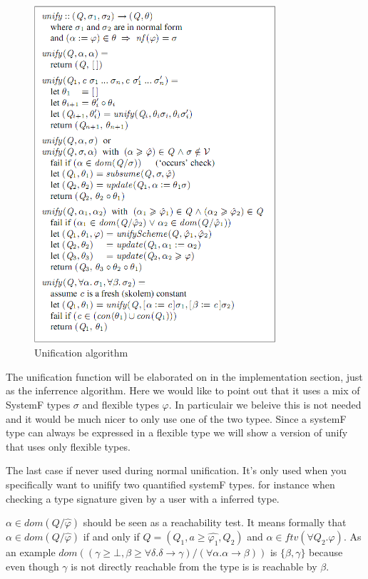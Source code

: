 \documentclass[12pt, a4paper, oneside]{article}
\begin{document}
\begin{figure}[h!]
  \centering
    \includegraphics[width=0.8\textwidth]{unify}
  \caption{Unification algorithm}
\end{figure}

The unification function will be elaborated on in the implementation section, just as the inferrence algorithm. Here we would like to point out that it uses a mix of SystemF types $\sigma$ and flexible types $\varphi$. In particulair we beleive this is not needed and it would be much nicer to only use one of the two typee. Since a systemF type can always be expressed in a flexible type we will show a version of unify that uses only flexible types.

The last case if never used during normal unification. It's only used when you specifically want to unifify two quantified systemF types. for instance when checking a type signature given by a user with a inferred type.

$\alpha \in dom(Q/\hat{\varphi})$ should be seen as a reachability test. It means formally that $\alpha \in dom(Q/\hat{\varphi})$ if and only if $Q = (Q_1, a \geq \hat{\varphi_1}, Q_2)$ and $\alpha \in ftv(\forall Q_2. \varphi)$. As an example $dom((\gamma \geq \bot, \beta \geq \forall \delta. \delta \rightarrow \gamma)/(\forall \alpha. \alpha \rightarrow \beta))$ is $\{\beta, \gamma\}$ because even though $\gamma$ is not directly reachable from the type is is reachable by $\beta$.
\end{document}
